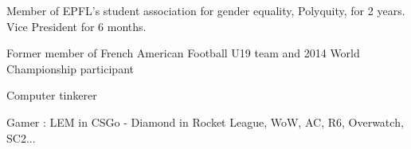


\begin{cventries}


\cventry
{} %
{}
{}
{}
{ %
\begin{cvitems}
\item {Member of EPFL's student association for gender equality, Polyquity, for 2 years. Vice President for 6 months.}
\item {Former member of French American Football U19 team and 2014 World Championship participant}
\item {Computer tinkerer}
\item {Gamer : LEM in CSGo - Diamond in Rocket League, WoW, AC, R6, Overwatch, SC2...}
\end{cvitems}
}




\end{cventries}
